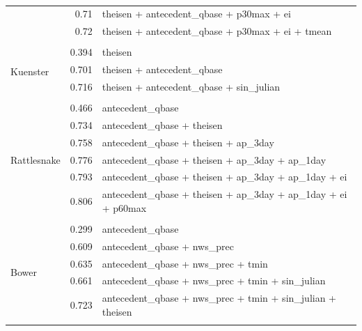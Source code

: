 \documentclass[10pt]{article}
\begin{document}
\begin{table}[h]
\begin{center}
\begin{tabular}{lrl}
 & 0.71 & theisen + antecedent\_qbase + p30max + ei\\ 
 & 0.72 & theisen + antecedent\_qbase + p30max + ei + tmean\\ 
\vspace{2mm}\\ \multirow{4}{*}{Kuenster} & 0.394 & theisen\\ 
 & 0.701 & theisen + antecedent\_qbase\\ 
 & 0.716 & theisen + antecedent\_qbase + sin\_julian\\ 
\vspace{2mm}\\ \multirow{7}{*}{Rattlesnake} & 0.466 & antecedent\_qbase\\ 
 & 0.734 & antecedent\_qbase + theisen\\ 
 & 0.758 & antecedent\_qbase + theisen + ap\_3day\\ 
 & 0.776 & antecedent\_qbase + theisen + ap\_3day + ap\_1day\\ 
 & 0.793 & antecedent\_qbase + theisen + ap\_3day + ap\_1day + ei\\ 
 & 0.806 & antecedent\_qbase + theisen + ap\_3day + ap\_1day + ei + p60max\\ 
\vspace{2mm}\\ \multirow{6}{*}{Bower} & 0.299 & antecedent\_qbase\\ 
 & 0.609 & antecedent\_qbase + nws\_prec\\ 
 & 0.635 & antecedent\_qbase + nws\_prec + tmin\\ 
 & 0.661 & antecedent\_qbase + nws\_prec + tmin + sin\_julian\\ 
 & 0.723 & antecedent\_qbase + nws\_prec + tmin + sin\_julian + theisen\\ 
\vspace{2mm}\\     \end{tabular}
    \caption{\label{sed_r_square_nosnow}}
    \end{center}
\end{table}
\end{document}
